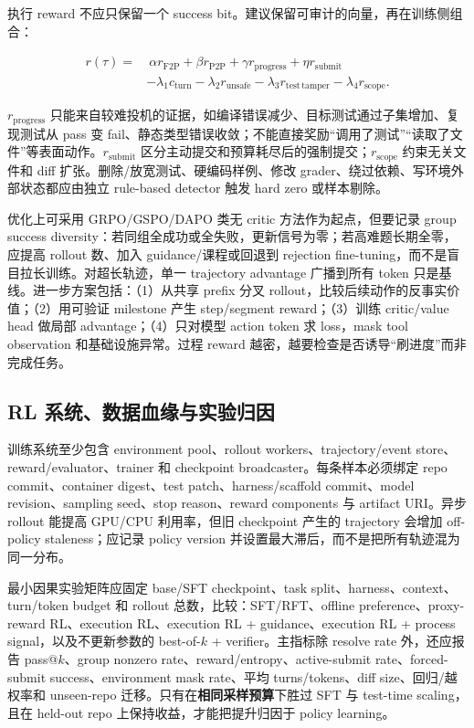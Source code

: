 \documentclass[10pt,a4paper,UTF8,fontset=none]{ctexart}
\begin{document}
执行 reward 不应只保留一个 success bit。建议保留可审计的向量，再在训练侧组合：

\begin{equation}
\begin{aligned}
r(\tau)=&\ \alpha r_{\mathrm{F2P}}+\beta r_{\mathrm{P2P}}+\gamma r_{\mathrm{progress}}
+\eta r_{\mathrm{submit}} \\
&-\lambda_1 c_{\mathrm{turn}}-\lambda_2 r_{\mathrm{unsafe}}
-\lambda_3 r_{\mathrm{test\,tamper}}-\lambda_4 r_{\mathrm{scope}} .
\end{aligned}
\label{zh:eq:reward}
\end{equation}

$r_{\mathrm{progress}}$ 只能来自较难投机的证据，如编译错误减少、目标测试通过子集增加、复现测试从 pass 变 fail、静态类型错误收敛；不能直接奖励“调用了测试”“读取了文件”等表面动作。$r_{\mathrm{submit}}$ 区分主动提交和预算耗尽后的强制提交；$r_{\mathrm{scope}}$ 约束无关文件和 diff 扩张。删除/放宽测试、硬编码样例、修改 grader、绕过依赖、写环境外部状态都应由独立 rule-based detector 触发 hard zero 或样本剔除。

优化上可采用 GRPO/GSPO/DAPO 类无 critic 方法作为起点，但要记录 group success diversity：若同组全成功或全失败，更新信号为零；若高难题长期全零，应提高 rollout 数、加入 guidance/课程或回退到 rejection fine-tuning，而不是盲目拉长训练。对超长轨迹，单一 trajectory advantage 广播到所有 token 只是基线。进一步方案包括：（1）从共享 prefix 分叉 rollout，比较后续动作的反事实价值；（2）用可验证 milestone 产生 step/segment reward；（3）训练 critic/value head 做局部 advantage；（4）只对模型 action token 求 loss，mask tool observation 和基础设施异常。过程 reward 越密，越要检查是否诱导“刷进度”而非完成任务。

\subsection{RL 系统、数据血缘与实验归因}

训练系统至少包含 environment pool、rollout workers、trajectory/event store、reward/evaluator、trainer 和 checkpoint broadcaster。每条样本必须绑定 repo commit、container digest、test patch、harness/scaffold commit、model revision、sampling seed、stop reason、reward components 与 artifact URI。异步 rollout 能提高 GPU/CPU 利用率，但旧 checkpoint 产生的 trajectory 会增加 off-policy staleness；应记录 policy version 并设置最大滞后，而不是把所有轨迹混为同一分布。

最小因果实验矩阵应固定 base/SFT checkpoint、task split、harness、context、turn/token budget 和 rollout 总数，比较：SFT/RFT、offline preference、proxy-reward RL、execution RL、execution RL + guidance、execution RL + process signal，以及不更新参数的 best-of-$k$ + verifier。主指标除 resolve rate 外，还应报告 pass@$k$、group nonzero rate、reward/entropy、active-submit rate、forced-submit success、environment mask rate、平均 turns/tokens、diff size、回归/越权率和 unseen-repo 迁移。只有在\textbf{相同采样预算}下胜过 SFT 与 test-time scaling，且在 held-out repo 上保持收益，才能把提升归因于 policy learning。
\end{document}

